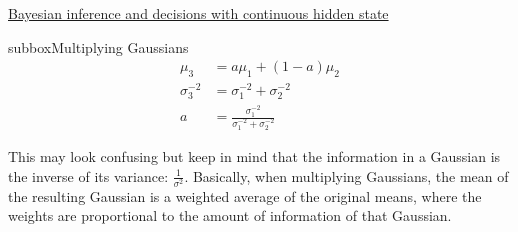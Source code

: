 \begin{textbox}{\href{https://compneuro.neuromatch.io/tutorials/W3D1_BayesianDecisions/student/W3D1_Tutorial2.html}{Bayesian inference and decisions with continuous hidden state } }
\begin{subbox}{subbox}{Multiplying Gaussians}
\begin{align}
\mu_{3} &= a\mu_{1} + (1-a)\mu_{2} \\
\sigma_{3}^{-2} &= \sigma_{1}^{-2} + \sigma_{2}^{-2} \\
a &= \frac{\sigma_{1}^{-2}}{\sigma_{1}^{-2} + \sigma_{2}^{-2}}
\end{align}

This may look confusing but keep in mind that the information in a Gaussian is the inverse of its variance: $\frac{1}{\sigma^2}$. Basically, when multiplying Gaussians, the mean of the resulting Gaussian is a weighted average of the original means, where the weights are proportional to the amount of information of that Gaussian.

\end{subbox}
\end{textbox}
